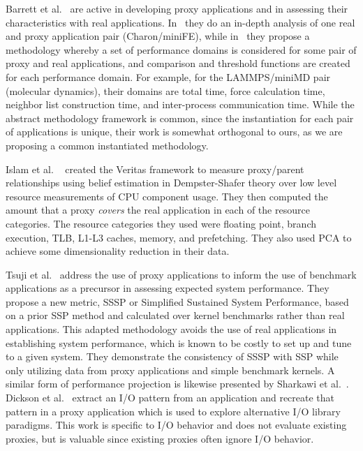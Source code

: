 \documentclass[conference]{IEEEtran}
\begin{document}
Barrett et al.~\cite{BARRETT2015107,CPE:CPE3587} are active in developing proxy applications and in assessing their characteristics with real applications. In~\cite{CPE:CPE3587} they do an in-depth analysis of one real and proxy application pair (Charon/miniFE), while in~\cite{BARRETT2015107} they propose a methodology whereby a set of performance domains is considered for some pair of proxy and real applications, and comparison and threshold functions are created for each performance domain.  For example, for the LAMMPS/miniMD pair (molecular dynamics), their domains are total time, force calculation time, neighbor list construction time, and inter-process communication time. While the abstract methodology framework is common, since the instantiation for each pair of applications is unique, their work is somewhat orthogonal to ours, as we are proposing a common instantiated methodology.

Islam et al. ~\cite{Islam:2016:MLF:3014904.3014966} created the Veritas framework to measure proxy/parent relationships using belief estimation in Dempster-Shafer theory over low level resource measurements of CPU component usage. They then computed the amount that a proxy \emph{covers} the real application in each of the resource categories. The resource categories they used were floating point, branch execution, TLB, L1-L3 caches, memory, and prefetching. They also used PCA to achieve some dimensionality reduction in their data.

Tsuji et al.~\cite{8049025} address the use of proxy applications to inform the use of benchmark applications as a precursor in assessing expected system performance. They propose a new metric, SSSP or Simplified Sustained System Performance, based on a prior SSP method and calculated over kernel benchmarks rather than real applications. This adapted methodology avoids the use of real applications in establishing system performance, which is known to be costly to set up and tune to a given system. They demonstrate the consistency of SSSP with SSP while only utilizing data from proxy applications and simple benchmark kernels. A similar form of performance projection is likewise presented by Sharkawi et al.~\cite{sharkawi2009performance}. Dickson et al.~\cite{7836562} extract an I/O pattern from an application and recreate that pattern in a proxy application which is used to explore alternative I/O library paradigms. This work is specific to I/O behavior and does not evaluate existing proxies, but is valuable since existing proxies often ignore I/O behavior.
\end{document}
